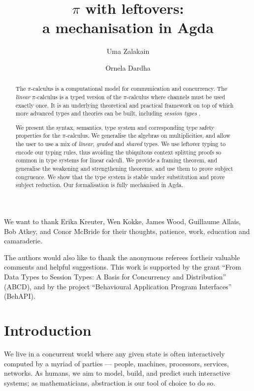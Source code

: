 \documentclass[sigplan,10pt,anonymous,review]{acmart}
\title[$\pi$ with leftovers: a mechanisation in Agda]{$\pi$ with leftovers: \\ a mechanisation in Agda}
\author{Uma Zalakain}
\affiliation{University of Glasgow, Scotland}
\author{Ornela Dardha}
\affiliation{University of Glasgow, Scotland}
\theoremstyle{definition}
\newcommand{\picalc}{$\pi$-calculus}
\begin{document}
\begin{acks}
We want to thank Erika Kreuter, Wen Kokke, James Wood, Guillaume Allais, Bob Atkey, and Conor McBride for their thoughts, patience, work, education and camaraderie.

The authors would also like to thank the anonymous referees fortheir valuable comments and helpful suggestions. This work is supported by the  grant  ``From Data Types to Session Types: A Basis for Concurrency and Distribution'' (ABCD), and by the  project  ``Behavioural Application Program Interfaces'' (BehAPI).
\end{acks}

\begin{abstract}
  The \picalc{} is a computational model for communication and concurrency.
  The \emph{linear} \picalc{} is a typed version of the \picalc{} where channels must be used exactly once.
  It is an underlying theoretical and practical framework on top of which more advanced types and theories can be built, including \emph{session types} \cite{H93,THK94,HVK98}.

  We present the syntax, semantics, type system and corresponding type safety properties for the \picalc{}.
  We generalise the algebras on multiplicities, and allow the user to use a mix of \emph{linear}, \emph{graded} and \emph{shared} types.
  We use leftover typing \cite{Allais2018a} to encode our typing rules, thus avoiding the ubiquitous context splitting proofs so common in type systems for linear calculi.
  We provide a framing theorem, and generalise the weakening and strengthening theorems, and use them to prove subject congruence.
  We show that the type system is stable under substitution and prove subject reduction.
%
  Our formalisation is fully mechanised in Agda.
\end{abstract}

\maketitle

\section{Introduction}

We live in a concurrent world where any given state is often interactively computed by a myriad of parties --- people, machines, processors, services, networks.
As humans, we aim to model, build, and predict such interactive systems; as mathematicians, abstraction is our tool of choice to do so.
\end{document}
